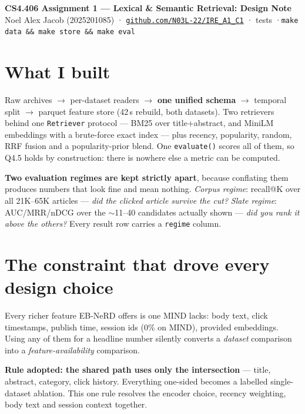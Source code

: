 \documentclass[10pt,a4paper]{article}
\begin{document}
\begin{center}
{\large\textbf{CS4.406 Assignment 1 --- Lexical \& Semantic Retrieval: Design Note}}\\[2pt]
{\small Noel Alex Jacob (2025201085) \quad·\quad
\href{https://github.com/N03L-22/IRE_A1_C1}{\texttt{github.com/N03L-22/IRE\_A1\_C1}} \quad· tests \quad·\quad \texttt{make data \&\& make store \&\& make eval}}
\end{center}
\vspace{-4pt}

\section{What I built}

Raw archives $\rightarrow$ per-dataset readers $\rightarrow$ \textbf{one unified schema} $\rightarrow$ temporal split
$\rightarrow$ parquet feature store (42\,s rebuild, both datasets). Two retrievers behind one
\texttt{Retriever} protocol --- BM25 over title+abstract, and MiniLM embeddings with a brute-force
exact index --- plus recency, popularity, random, RRF fusion and a popularity-prior blend. One
\texttt{evaluate()} scores all of them, so Q4.5 holds by construction: there is nowhere else a metric
can be computed.

\textbf{Two evaluation regimes are kept strictly apart}, because conflating them produces numbers
that look fine and mean nothing. \emph{Corpus regime}: recall@K over all 21K--65K articles ---
\emph{did the clicked article survive the cut?} \emph{Slate regime}: AUC/MRR/nDCG over the
$\sim$11--40 candidates actually shown --- \emph{did you rank it above the others?} Every result row
carries a \texttt{regime} column.

\section{The constraint that drove every design choice}

Every richer feature EB-NeRD offers is one MIND lacks: body text, click timestamps, publish time,
session ids (0\% on MIND), provided embeddings. Using any of them for a headline number silently
converts a \emph{dataset} comparison into a \emph{feature-availability} comparison.

\textbf{Rule adopted: the shared path uses only the intersection} --- title, abstract, category,
click history. Everything one-sided becomes a labelled single-dataset ablation. This one rule
resolves the encoder choice, recency weighting, body text and session context together.
\end{document}
